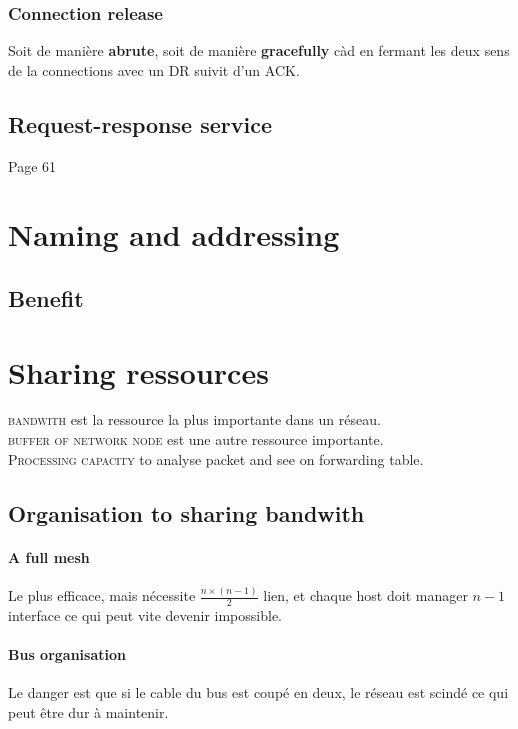 \documentclass{report}
\begin{document}
\subsubsection{Connection release}
Soit de manière \textbf{abrute}, soit de manière \textbf{gracefully} càd en fermant
les deux sens de la connections avec un DR suivit d'un ACK.


\subsection{Request-response service}

Page 61

\section{Naming and addressing}

\subsection{Benefit}

\section{Sharing ressources}

\textsc{bandwith} est la ressource la plus importante dans un réseau.\\
\textsc{buffer of network node} est une autre ressource importante.\\
\textsc{Processing capacity} to analyse packet and see on forwarding table.

\subsection{Organisation to sharing bandwith}

\paragraph{A full mesh}
Le plus efficace, mais nécessite $\frac{n \times (n-1)}{2}$ lien, et chaque 
host doit manager $n-1$ interface ce qui peut vite devenir impossible.

\paragraph{Bus organisation}
Le danger est que si le cable du bus est coupé en deux, le réseau est scindé
ce qui peut être dur à maintenir.
\end{document}
